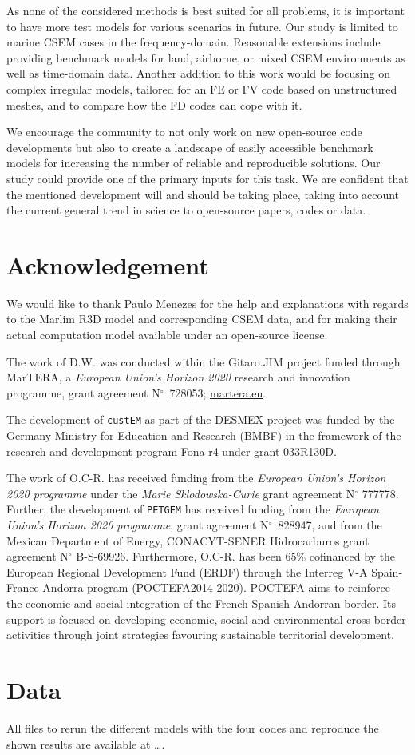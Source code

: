 \documentclass[
    paper,
  ]{geophysics}
\newcommand{\custem}{\texttt{custEM}\xspace}
\newcommand{\petgem}{\texttt{PETGEM}\xspace}
\newcommand{\itodo}[1]{\todo[inline]{\sffamily #1}}
\begin{document}
As none of the considered methods is best suited for all problems, it is important to have more test models for various scenarios in future. Our study is limited to marine CSEM cases in the frequency-domain. Reasonable extensions include providing benchmark models for land, airborne, or mixed CSEM environments as well as time-domain data. Another addition to this work would be focusing on complex irregular  models, tailored for an FE or FV code based on unstructured meshes, and to compare how the FD codes can cope with it.

We encourage the community to not only work on new open-source code developments but also to create a landscape of easily accessible benchmark models for increasing the number of reliable and reproducible solutions. Our study could provide one of the primary inputs for this task. We are confident that the mentioned development will and should be taking place, taking into account the current general trend in science to open-source papers, codes or data.




\section{Acknowledgement}


We would like to thank Paulo Menezes for the help and explanations with regards to the Marlim R3D model and corresponding CSEM data, and for making their actual computation model available under an open-source license.

The work of D.W. was conducted within the Gitaro.JIM project funded through MarTERA, a \emph{European Union's Horizon 2020} research and innovation programme, grant agreement N$^\circ$~728053; \href{https://www.martera.eu}{martera.eu}.

The development of \custem as part of the DESMEX project was funded by the Germany Ministry for Education and Research (BMBF) in the framework of the research and development program Fona-r4 under grant 033R130D.

The work of O.C-R. has received funding from the \emph{European Union's Horizon 2020 programme} under the \emph{Marie Sklodowska-Curie} grant agreement N$^\circ$ 777778. Further, the development of \petgem has received funding from the \emph{European Union's Horizon 2020 programme}, grant agreement N$^\circ$~828947, and from the Mexican Department of Energy, CONACYT-SENER Hidrocarburos grant agreement N$^\circ$ B-S-69926. Furthermore, O.C-R. has been 65\% cofinanced by the European Regional Development Fund (ERDF) through the Interreg V-A Spain-France-Andorra program (POCTEFA2014-2020). POCTEFA aims to reinforce the economic and social integration of the French-Spanish-Andorran border. Its support is focused on developing economic, social and environmental cross-border activities through joint strategies favouring sustainable territorial development.


\section{Data}

All files to rerun the different models with the four codes and reproduce the shown results are available at \dots.
\itodo{Put up on Zenodo, link here.}



\end{document}
